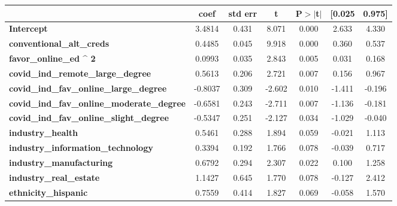 {
\def\sym#1{\ifmmode^{#1}\else\(^{#1}\)\fi}
\begin{tabular}{lcccccc}
\toprule
                                                   & \textbf{coef} & \textbf{std err} & \textbf{t} & \textbf{P$> |$t$|$} & \textbf{[0.025} & \textbf{0.975]}  \\
\midrule
\textbf{Intercept}                                 &       3.4814  &        0.431     &     8.071  &         0.000        &        2.633    &        4.330     \\
\textbf{conventional\_alt\_creds}                  &       0.4485  &        0.045     &     9.918  &         0.000        &        0.360    &        0.537     \\
\textbf{favor\_online\_ed ^ 2}                     &       0.0993  &        0.035     &     2.843  &         0.005        &        0.031    &        0.168     \\
\textbf{covid\_ind\_remote\_large\_degree}         &       0.5613  &        0.206     &     2.721  &         0.007        &        0.156    &        0.967     \\
\textbf{covid\_ind\_fav\_online\_large\_degree}    &      -0.8037  &        0.309     &    -2.602  &         0.010        &       -1.411    &       -0.196     \\
\textbf{covid\_ind\_fav\_online\_moderate\_degree} &      -0.6581  &        0.243     &    -2.711  &         0.007        &       -1.136    &       -0.181     \\
\textbf{covid\_ind\_fav\_online\_slight\_degree}   &      -0.5347  &        0.251     &    -2.127  &         0.034        &       -1.029    &       -0.040     \\
\textbf{industry\_health}                          &       0.5461  &        0.288     &     1.894  &         0.059        &       -0.021    &        1.113     \\
\textbf{industry\_information\_technology}         &       0.3394  &        0.192     &     1.766  &         0.078        &       -0.039    &        0.717     \\
\textbf{industry\_manufacturing}                   &       0.6792  &        0.294     &     2.307  &         0.022        &        0.100    &        1.258     \\
\textbf{industry\_real\_estate}                    &       1.1427  &        0.645     &     1.770  &         0.078        &       -0.127    &        2.412     \\
\textbf{ethnicity\_hispanic}                       &       0.7559  &        0.414     &     1.827  &         0.069        &       -0.058    &        1.570     \\

\end{tabular}}

